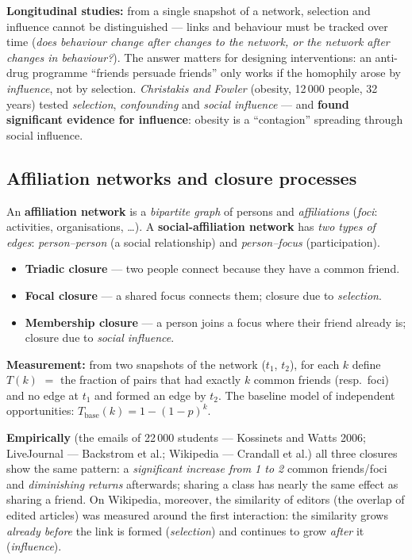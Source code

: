 \documentclass[11pt,a4paper]{article}
\theoremstyle{definition}
\providecommand{\uv}[1]{``#1''}
\begin{document}
\textbf{Longitudinal studies:} from a single snapshot of a network, selection and influence
cannot be distinguished --- links and behaviour must be tracked over time (\emph{does
behaviour change after changes to the network, or the network after changes in behaviour?}).
The answer matters for designing interventions: an anti-drug programme \uv{friends persuade
friends} only works if the homophily arose by \emph{influence}, not by selection.
\emph{Christakis and Fowler} (obesity, 12\,000 people, 32 years) tested \emph{selection},
\emph{confounding} and \emph{social influence} --- and \textbf{found significant evidence for
influence}: obesity is a \uv{contagion} spreading through social influence.

\subsection{Affiliation networks and closure processes}

\begin{defbox}
An \textbf{affiliation network} is a \emph{bipartite graph} of persons and \emph{affiliations}
(\emph{foci}: activities, organisations, \dots). A \textbf{social-affiliation network} has
\emph{two types of edges}: \emph{person--person} (a social relationship) and
\emph{person--focus} (participation).
\end{defbox}

\begin{defbox}
\begin{itemize}
\item \textbf{Triadic closure} --- two people connect because they have a common friend.
\item \textbf{Focal closure} --- a shared focus connects them; closure due to
      \emph{selection}.
\item \textbf{Membership closure} --- a person joins a focus where their friend already is;
      closure due to \emph{social influence}.
\end{itemize}
\end{defbox}

\textbf{Measurement:} from two snapshots of the network ($t_1$, $t_2$), for each $k$ define
$T(k)$ $=$ the fraction of pairs that had exactly $k$ common friends (resp.\ foci) and no edge
at $t_1$ and formed an edge by $t_2$. The baseline model of independent opportunities:
$T_{\text{base}}(k)=1-(1-p)^{k}$.

\textbf{Empirically} (the emails of 22\,000 students --- Kossinets and Watts 2006;
LiveJournal --- Backstrom et al.; Wikipedia --- Crandall et al.) all three closures show the
same pattern: a \emph{significant increase from 1 to 2} common friends/foci and
\emph{diminishing returns} afterwards; sharing a class has nearly the same effect as sharing
a friend. On Wikipedia, moreover, the similarity of editors (the overlap of edited articles)
was measured around the first interaction: the similarity grows \emph{already before} the
link is formed (\emph{selection}) and continues to grow \emph{after} it (\emph{influence}).
\end{document}
